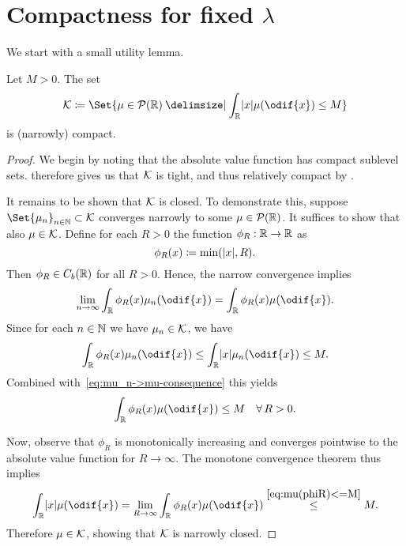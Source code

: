 \section{Compactness for fixed \texorpdfstring{\( \lambda \)}{lambda}}


We start with a small utility lemma.

\begin{lemma}\label{lem:K-set-compact}
  Let \( M > 0 \).
  The set
  \begin{equation}
    \cK \coloneqq \Set{ \mu \in \cP(\bR) \given \int_\bR \abs{x} \mu(\odif{x}) \leq M }
  \end{equation}
  is (narrowly) compact.
\end{lemma}

\begin{proof}
  We begin by noting that the absolute value function has compact sublevel sets.
   therefore gives us that \( \mathcal{K} \) is tight, and thus relatively compact by .

  It remains to be shown that \( \mathcal{K} \) is closed.
  To demonstrate this, suppose \( \Set{\mu_n}_{n\in\bN} \subset \cK \) converges narrowly to some \( \mu \in \mathcal{P}(\mathbb{R}) \).
  It suffices to show that also \( \mu \in \mathcal{K} \).
  Define for each \( R > 0 \) the function \( \phi_R : \mathbb{R} \to \mathbb{R} \) as
  \begin{equation}
    \phi_R(x) \coloneqq \min(\lvert x\rvert, R).
  \end{equation}
  Then \( \phi_R \in C_b(\mathbb{R}) \) for all \( R > 0 \).
  Hence, the narrow convergence implies
  \begin{equation}\label{eq:mu_n->mu-consequence}
    \lim_{n\to\infty} \int_\bR \phi_R(x) \mu_n(\odif{x}) = \int_\bR \phi_R(x) \mu(\odif{x}).
  \end{equation}
  Since for each \( n \in \mathbb{N} \) we have \( \mu_n \in \mathcal{K} \), we have
  \begin{equation}
    \int_\bR \phi_R(x) \mu_n(\odif{x}) \leq \int_\bR \abs{x} \mu_n(\odif{x}) \leq M.
  \end{equation}
  Combined with~\eqref{eq:mu_n->mu-consequence} this yields
  \begin{equation}\label{eq:mu(phiR)<=M}
    \int_\bR \phi_R(x) \mu(\odif{x}) \leq M \quad \forall R > 0.
  \end{equation}

  Now, observe that \( \phi_R \) is monotonically increasing and converges pointwise to the absolute value function for \( R \to \infty \).
  The monotone convergence theorem thus implies
  \begin{equation}
    \int_\bR \abs{x} \mu(\odif{x})
    = \lim_{R\to\infty} \int_\bR \phi_R(x) \mu(\odif{x})
    \overset{\eqref{eq:mu(phiR)<=M}}{\leq} M.
  \end{equation}
  Therefore \( \mu \in \mathcal{K} \), showing that \( \mathcal{K} \) is narrowly closed.
\end{proof}


